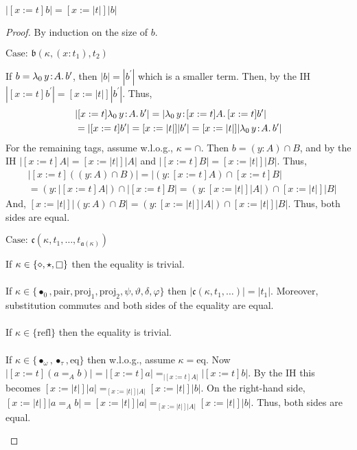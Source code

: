 \begin{lemma}
    \label{lem:2:erase_subst}
    $|[x := t]b| = [x := |t|]|b|$
\end{lemma}
\begin{proof}
    By induction on the size of $b$.

    $\text{Case: }\mathfrak{b}(\kappa, (x : t_1), t_2)$
    \begin{proofcase}
        If $b = {\lambda_0}\, y\! : \! A.\, b^\prime$, then $|b| = |b^\prime|$ which is a smaller term.
        Then, by the IH $|[x := t]b^\prime| = [x := |t|]|b^\prime|$.
        Thus,
        \begin{align*}
            &|[x := t]{\lambda_0}\, y\! : \! A.\, b^\prime| = |{\lambda_0}\, y\! : \! [x := t]A.\, [x := t]b^\prime| \\
            &= |[x := t]b^\prime| = [x := |t|]|b^\prime| = [x := |t|]|{\lambda_0}\, y\! : \! A.\, b^\prime|
        \end{align*}
        For the remaining tags, assume w.l.o.g., $\kappa = \cap$.
        Then $b = (y : A) \cap B$, and by the IH $|[x := t]A| = [x := |t|]|A|$ and $|[x := t]B| = [x := |t|]|B|$.
        Thus,
        \begin{align*}
            &|[x := t]((y : A) \cap B)| = |(y : [x := t]A) \cap [x := t]B| \\
            &= (y : |[x := t]A|) \cap |[x := t]B| = (y : [x := |t|]|A|) \cap [x := |t|]|B|
        \end{align*}
        And, $[x := |t|]|(y : A) \cap B| = (y : [x := |t|]|A|) \cap [x := |t|]|B|$.
        Thus, both sides are equal.
    \end{proofcase}

    $\text{Case: }\mathfrak{c}(\kappa, t_1, \ldots, t_{\mathfrak{a}(\kappa)})$
    \begin{proofcase}
        If $\kappa \in \{ \diamond, \star, \kind \}$ then the equality is trivial.
        \\ \\
        If $\kappa \in \{ \bullet_0, \text{pair}, \text{proj}_1, \text{proj}_2, \psi, \vartheta, \delta, \varphi \}$ then $|\mathfrak{c}(\kappa, t_1, \ldots)| = |t_1|$.
        Moreover, substitution commutes and both sides of the equality are equal.
        \\ \\
        If $\kappa \in \{ \text{refl} \}$ then the equality is trivial.
        \\ \\
        If $\kappa \in \{ \bullet_\omega, \bullet_\tau, \text{eq} \}$ then w.l.o.g., assume $\kappa = \text{eq}$.
        Now $|[x := t](a =_A b)| = |[x := t]a| =_{|[x := t]A|} |[x := t]b|$.
        By the IH this becomes $[x := |t|]|a| =_{[x := |t|]|A|} [x := |t|]|b|$.
        On the right-hand side, $[x := |t|]|a =_A b| = [x := |t|]|a| =_{[x := |t|]|A|} [x := |t|]|b|$.
        Thus, both sides are equal.
    \end{proofcase}


\end{proof}
